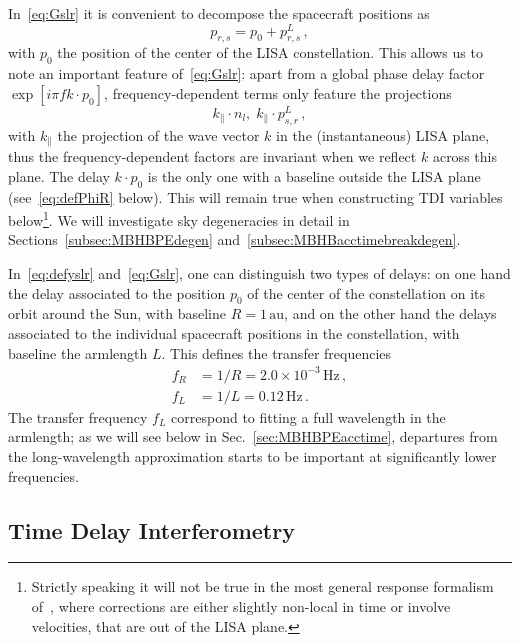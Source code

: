 \documentclass[aps,showpacs,twocolumn,prd,superscriptaddress,nofootinbib]{revtex4-1}
\newcommand{\be}{\begin{equation}}
\newcommand{\ee}{\end{equation}}
\newcommand{\bsub}{\begin{subequations}}
\newcommand{\esub}{\end{subequations}}
\newcommand{\Hz}{\,\mathrm{Hz}}
\newcommand{\au}{\,\mathrm{au}}
\begin{document}
In~\eqref{eq:Gslr} it is convenient to decompose the spacecraft positions as
\be\label{eq:defp0}
	p_{r,s} = p_{0} + p_{r,s}^{L} \,,
\ee
with $p_{0}$ the position of the center of the LISA constellation. This allows us to note an important feature of~\eqref{eq:Gslr}: apart from a global phase delay factor $\exp[i \pi f k\cdot p_{0}]$, frequency-dependent terms only feature the projections
\be
	k_{\parallel} \cdot n_{l}, \; k_{\parallel} \cdot p_{s,r}^{L} \,,
\ee
with $k_{\parallel}$ the projection of the wave vector $k$ in the (instantaneous) LISA plane, thus the frequency-dependent factors are invariant when we reflect $k$ across this plane. The delay $k\cdot p_{0}$ is the only one with a baseline outside the LISA plane (see~\eqref{eq:defPhiR} below). This will remain true when constructing TDI variables below\footnote{Strictly speaking it will not be true in the most general response formalism of~\cite{MB18}, where corrections are either slightly non-local in time or involve velocities, that are out of the LISA plane.}. We will investigate sky degeneracies in detail in Sections~\ref{subsec:MBHBPEdegen} and~\ref{subsec:MBHBacctimebreakdegen}.

In~\eqref{eq:defyslr} and~\eqref{eq:Gslr}, one can distinguish two types of delays: on one hand the delay associated to the position $p_{0}$ of the center of the constellation on its orbit around the Sun, with baseline $R=1 \au$, and on the other hand the delays associated to the individual spacecraft positions in the constellation, with baseline the armlength $L$. This defines the transfer frequencies
\bsub\label{eq:transferfrequencies}
\begin{align}
	f_{R} &= 1/R = 2.0\times10^{-3}\Hz \,,\\
	f_{L} &= 1/L = 0.12\Hz \,.
\end{align}
\esub
The transfer frequency $f_{L}$ correspond to fitting a full wavelength in the armlength; as we will see below in Sec.~\ref{sec:MBHBPEacctime}, departures from the long-wavelength approximation starts to be important at significantly lower frequencies.


\subsection{Time Delay Interferometry}
\label{subsec:TDIresponse}
\end{document}
